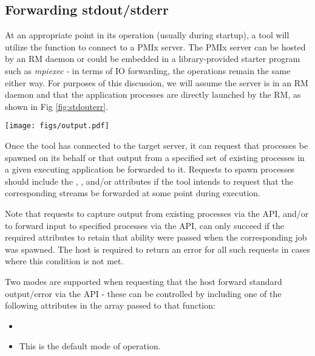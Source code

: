 \subsection{Forwarding stdout/stderr}

At an appropriate point in its operation (usually during startup), a tool will utilize the  function to connect to a \ac{PMIx} server. The \ac{PMIx} server can be hosted by an \ac{RM} daemon or could be embedded in a library-provided starter program such as \textit{mpiexec} - in terms of \ac{IO} forwarding, the operations remain the same either way. For purposes of this discussion, we will assume the server is in an \ac{RM} daemon and that the application processes are directly launched by the \ac{RM}, as shown in Fig \ref{fig:stdouterr}.

\begingroup
\begin{figure*}[ht!]
  \begin{center}
    \texttt{[image: figs/output.pdf]}
  \end{center}
  \caption{Forwarding stdout/stderr}
  \label{fig:stdouterr}
\end{figure*}
\endgroup

Once the tool has connected to the target server, it can request that
processes be spawned on its behalf or that output from a specified set of
existing processes in a given executing application be forwarded to it.
Requests to spawn processes should include the ,
, and/or  attributes if the
tool intends to request that the corresponding streams be forwarded at some
point during execution.

Note that requests to capture output from existing processes via the
 \ac{API}, and/or to forward input to specified
processes via the  \ac{API}, can only succeed if the
required attributes to retain that ability were passed when the corresponding
job was spawned. The host is required to return an error for all such requests
in cases where this condition is not met.

Two modes are supported when requesting that the host forward standard output/error via the  \ac{API} - these can be controlled by including one of the following attributes in the  array passed to that function:

\begin{itemize}
    \item {}
    \item {}This is the default mode of operation.
    \pasteAttributeItemEnd{}
\end{itemize}

